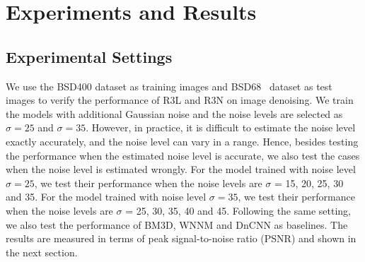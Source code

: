 \documentclass{article}
\begin{document}
\begin{table}[htbp]
\centering
\caption{Specific design of the layers} \label{tab:layer}
\end{table}


\section{Experiments and Results}
\subsection{Experimental Settings}
We use the  BSD400 dataset as training images and BSD68~\cite{1467533} dataset as test images to verify the performance of R3L and R3N on image denoising. We train the models with additional Gaussian noise and the noise levels are selected as $\sigma = 25$ and $\sigma = 35$. However, in practice, it is difficult to estimate the noise level exactly accurately, and the noise level can vary in a range. Hence, besides testing the performance when the estimated noise level is accurate, we also test the cases when the noise level is estimated wrongly. For the model trained with noise level $\sigma = 25$, we test their performance when the noise levels are $\sigma$ = 15, 20, 25, 30 and 35. For the model trained with noise level $\sigma = 35$, we test their performance when the noise levels are $\sigma$ = 25, 30, 35, 40 and 45. Following the same setting, we also test the performance of BM3D, WNNM and DnCNN as baselines. The results are measured in terms of peak signal-to-noise ratio (PSNR) and shown in the next section.
\end{document}
